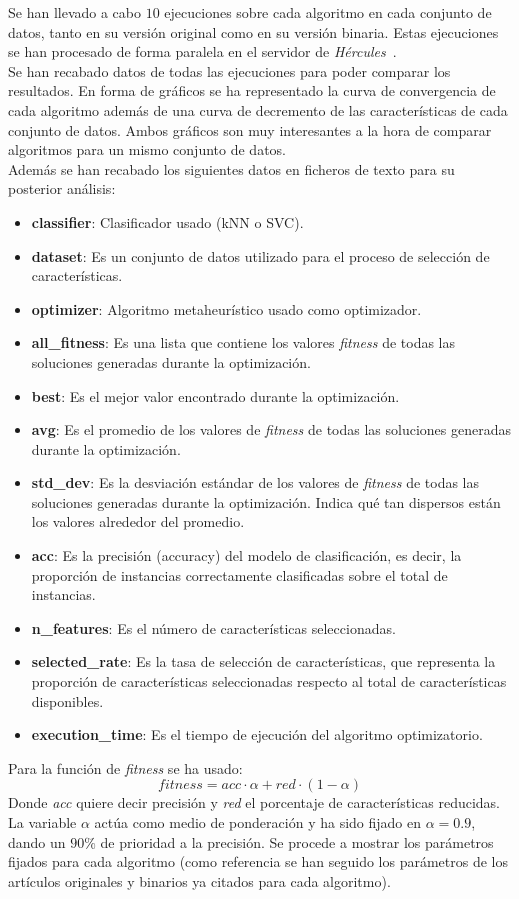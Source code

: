Se han llevado a cabo $10$ ejecuciones sobre cada algoritmo en cada conjunto de datos, tanto en su versión original como en su versión binaria. Estas ejecuciones se han procesado de forma paralela en el servidor de \textit{Hércules}~\cite{citicugr}.\\[6pt]
Se han recabado datos de todas las ejecuciones para poder comparar los resultados. En forma de gráficos se ha representado la curva de convergencia de cada algoritmo además de una curva de decremento de las características de cada conjunto de datos. Ambos gráficos son muy interesantes a la hora de comparar algoritmos para un mismo conjunto de datos.\\[6pt]
Además se han recabado los siguientes datos en ficheros de texto para su posterior análisis:
\begin{itemize}
    \item \textbf{classifier}: Clasificador usado (kNN o SVC).
    \item \textbf{dataset}: Es un conjunto de datos utilizado para el proceso de selección de características.
    \item \textbf{optimizer}: Algoritmo metaheurístico usado como optimizador.
    \item \textbf{all\_fitness}: Es una lista que contiene los valores \textit{fitness} de todas las soluciones generadas durante la optimización.
    \item \textbf{best}: Es el mejor valor encontrado durante la optimización.
    \item \textbf{avg}: Es el promedio de los valores de \textit{fitness} de todas las soluciones generadas durante la optimización.
    \item \textbf{std\_dev}: Es la desviación estándar de los valores de \textit{fitness} de todas las soluciones generadas durante la optimización. Indica qué tan dispersos están los valores alrededor del promedio.
    \item \textbf{acc}: Es la precisión (accuracy) del modelo de clasificación, es decir, la proporción de instancias correctamente clasificadas sobre el total de instancias.
    \item \textbf{n\_features}: Es el número de características seleccionadas.
    \item \textbf{selected\_rate}: Es la tasa de selección de características, que representa la proporción de características seleccionadas respecto al total de características disponibles.
    \item \textbf{execution\_time}: Es el tiempo de ejecución del algoritmo optimizatorio.
\end{itemize}
Para la función de \textit{fitness} se ha usado:
\begin{equation}
    fitness = acc\cdot\alpha + red\cdot(1-\alpha)
\end{equation}
Donde \textit{acc} quiere decir precisión y \textit{red} el porcentaje de características reducidas. La variable $\alpha$ actúa como medio de ponderación y ha sido fijado en $\alpha=0.9$, dando un $90\%$ de prioridad a la precisión.
Se procede a mostrar los parámetros fijados para cada algoritmo (como referencia se han seguido los parámetros de los artículos originales y binarios ya citados para cada algoritmo).

